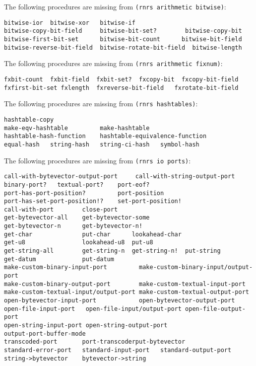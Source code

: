\documentclass[onecolumn, 12pt, twoside, openright, dvipdfm]{book}
\begin{document}
The following procedures are missing from \texttt{(rnrs arithmetic
bitwise)}:
\begin{Verbatim}
bitwise-ior  bitwise-xor   bitwise-if 
bitwise-copy-bit-field     bitwise-bit-set?        bitwise-copy-bit 
bitwise-first-bit-set      bitwise-bit-count      bitwise-bit-field 
bitwise-reverse-bit-field  bitwise-rotate-bit-field  bitwise-length  
\end{Verbatim}


The following procedures are missing from \texttt{(rnrs arithmetic
fixnum)}:
\begin{Verbatim}
fxbit-count  fxbit-field  fxbit-set?  fxcopy-bit  fxcopy-bit-field
fxfirst-bit-set fxlength  fxreverse-bit-field   fxrotate-bit-field   
\end{Verbatim}


The following procedures are missing from \texttt{(rnrs hashtables)}:
\begin{Verbatim}
hashtable-copy
make-eqv-hashtable         make-hashtable
hashtable-hash-function    hashtable-equivalence-function 
equal-hash   string-hash   string-ci-hash   symbol-hash
\end{Verbatim}



The following procedures are missing from \texttt{(rnrs io ports)}:
\begin{Verbatim}
call-with-bytevector-output-port     call-with-string-output-port
binary-port?   textual-port?    port-eof?     
port-has-port-position?         port-position 
port-has-set-port-position!?    set-port-position!
call-with-port        close-port
get-bytevector-all    get-bytevector-some
get-bytevector-n      get-bytevector-n!
get-char              put-char      lookahead-char    
get-u8                lookahead-u8  put-u8
get-string-all        get-string-n  get-string-n!  put-string
get-datum             put-datum
make-custom-binary-input-port         make-custom-binary-input/output-port    
make-custom-binary-output-port        make-custom-textual-input-port    
make-custom-textual-input/output-port make-custom-textual-output-port
open-bytevector-input-port            open-bytevector-output-port 
open-file-input-port   open-file-input/output-port open-file-output-port    
open-string-input-port open-string-output-port
output-port-buffer-mode
transcoded-port       port-transcoderput-bytevector 
standard-error-port   standard-input-port   standard-output-port 
string->bytevector    bytevector->string
\end{Verbatim}




\nocite{ghuloum-implicit}
\nocite{ghuloum-generation}

\backmatter
\appendix


\printindex
\end{document}

